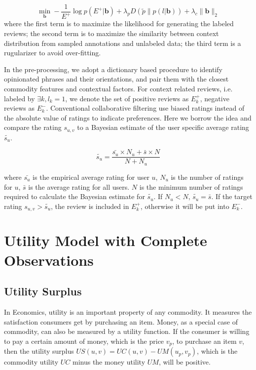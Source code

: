 \documentclass[preprint,12pt]{elsarticle}
\begin{document}
\begin{equation}\label{equ:cat}
  \min_{\mathbf{b}}\!-\frac{1}{E^+}\!\log\!p(E^+|\mathbf{b})\!+\!\lambda_pD(\tilde{p}\|p(l|\mathbf{b}))\!+\!\lambda_c\|\mathbf{b}\!\|_2
\end{equation}
where the first term is to maximize the likelihood for generating the labeled reviews; the second term is to maximize the similarity between context distribution from sampled annotations and unlabeled data; the third term is a rugularizer to avoid over-fitting.

In the pre-processing, we adopt a dictionary based procedure to identify opinionated phrases and their orientations, and pair them with the closest commodity features and contextual factors. For context related reviews, i.e. labeled by $\exists k, l_k=1$, we denote the set of positive reviews as $E^+_k$, negative reviews as $E^-_k$. Conventional collaborative filtering use biased ratings instead of the absolute value of ratings to indicate preferences. Here we borrow the idea and compare the rating $s_{u,v}$ to a Bayesian estimate of the user specific average rating $\tilde{s_u}$. 

\begin{equation}\label{equ:average}
\tilde{s_u}=\frac{\bar{s_u}\times N_u+ \bar{s}\times N}{N+N_u}
\end{equation}  
 
where $\bar{s_u}$ is the empirical average rating for user $u$, $N_u$ is the number of ratings for $u$, $\bar{s}$ is the average rating for all users. $N$ is the minimum number of ratings required to calculate the Bayesian estimate for $\tilde{s_u}$. If $N_u <N$, $\tilde{s_u}= \bar{s}$. If the target rating $s_{u,v}>\tilde{s_u}$, the review is included in $E^+_k$, otherwise it will be put into $E^-_k$.
 
\section{Utility Model with Complete Observations}\label{sec:util}
\subsection{Utility Surplus}
In Economics, utility is an important property of any commodity. It measures the satisfaction consumers get by purchasing an item. Money, as a special case of commodity, can also be measured by a utility function. If the consumer is willing to pay a certain amount of money, which is the price $v_p$, to purchase an item $v$, then the utility surplus $US(u,v)=UC(u,v)-UM(u_p,v_p)$, which is the commodity utility $UC$ minus the money utility $UM$, will be positive.
\end{document}

